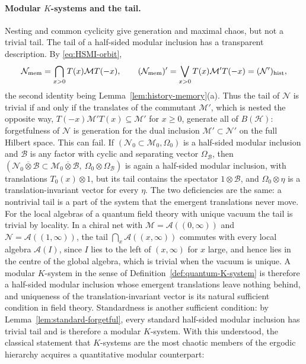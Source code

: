 \documentclass[a4paper,11pt]{article}
\theoremstyle{definition}
\begin{document}
\paragraph{Modular $K$-systems and the tail.}
Nesting and common cyclicity give generation and maximal chaos, but not a trivial tail. The tail of a half-sided modular inclusion has a transparent description. By \eqref{eq:HSMI-orbit},
\begin{equation}
 \mathcal N_{\rm mem}=\bigcap_{x>0}T(x)\mathcal MT(-x),
 \qquad
 (\mathcal N_{\rm mem})'=\bigvee_{x>0}T(x)\mathcal M'T(-x)=(\mathcal N')_{\rm hist},
 \label{eq:HSMI-tail}
\end{equation}
the second identity being Lemma~\ref{lem:history-memory}(a). Thus the tail of $\mathcal N$ is trivial if and only if the translates of the commutant $\mathcal M'$, which is nested the opposite way, $T(-x)\mathcal M'T(x)\subseteq\mathcal M'$ for $x\ge0$, generate all of $B(\mathcal H)$: forgetfulness of $\mathcal N$ is generation for the dual inclusion $\mathcal M'\subset\mathcal N'$ on the full Hilbert space. This can fail. If $(\mathcal N_0\subset\mathcal M_0,\Omega_0)$ is a half-sided modular inclusion and $\mathcal B$ is any factor with cyclic and separating vector $\Omega_{\mathcal B}$, then $(\mathcal N_0\overline\otimes\mathcal B\subset\mathcal M_0\overline\otimes\mathcal B,\ \Omega_0\otimes\Omega_{\mathcal B})$ is again a half-sided modular inclusion, with translations $T_0(x)\otimes1$, but its tail contains the spectator $1\otimes\mathcal B$, and $\Omega_0\otimes\eta$ is a translation-invariant vector for every $\eta$. The two deficiencies are the same: a nontrivial tail is a part of the system that the emergent translations never move. For the local algebras of a quantum field theory with unique vacuum the tail is trivial by locality. In a chiral net with $\mathcal M=\mathcal A((0,\infty))$ and $\mathcal N=\mathcal A((1,\infty))$, the tail $\bigcap_{x}\mathcal A((x,\infty))$ commutes with every local algebra $\mathcal A(I)$, since $I$ lies to the left of $(x,\infty)$ for $x$ large, and hence lies in the centre of the global algebra, which is trivial when the vacuum is unique. A modular $K$-system in the sense of Definition~\ref{def:quantum-K-system} is therefore a half-sided modular inclusion whose emergent translations leave nothing behind, and uniqueness of the translation-invariant vector is its natural sufficient condition in field theory. Standardness is another sufficient condition: by Lemma~\ref{lem:standard-forgetful}, every standard half-sided modular inclusion has trivial tail and is therefore a modular $K$-system. With this understood, the classical statement that $K$-systems are the most chaotic members of the ergodic hierarchy acquires a quantitative modular counterpart:
\end{document}
